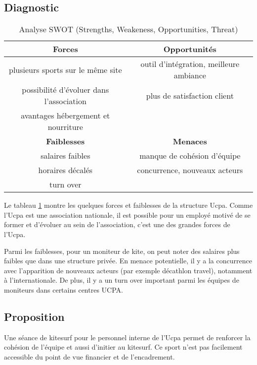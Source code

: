 \documentclass[11pt,a4paper]{report}
\begin{document}
\subsection{Diagnostic}
\begin{table}[h]
\centering
\begin{tabular}{|c|c|}
        \hline
        \textbf{Forces}                          & \textbf{Opportunités} \\ 
        \hline
        plusieurs sports sur le m\^eme site      &  outil d'intégration, meilleure ambiance\\
        possibilité d'évoluer dans l'association & plus de satisfaction client  \\
        avantages hébergement et nourriture      &                              \\
        \hline
        \textbf{Faiblesses}                      &  \textbf{Menaces} \\ 
        \hline
        salaires faibles                         & manque de cohésion d'équipe \\
        horaires décalés                         & concurrence, nouveaux acteurs   \\
        turn over                                &                               \\
        \hline
\end{tabular}
\caption{Analyse SWOT (Strengths, Weakeness, Opportunities, Threat)\label{swot}}
\end{table}
Le tableau \ref{swot} montre les quelques forces et faiblesses de la 
structure Ucpa. Comme l'Ucpa est une association nationale, il est 
possible pour un  employé motivé de se former et d'évoluer
au sein de l'association, c'est une des grandes forces de l'Ucpa.
 
Parmi les faiblesses, pour un moniteur de kite, on peut noter des
salaires plus faibles que dans une structure privée. 
En menace potentielle, il y a  la concurrence avec 
l’apparition de nouveaux acteurs (par exemple décathlon travel),
notamment à l'internationale. De plus, il  y a un turn over
important parmi les équipes  de moniteurs dans certains centres UCPA.

\subsection{Proposition}

Une séance de kitesurf pour le personnel interne de l'Ucpa 
permet de renforcer la cohésion de l'équipe et aussi d'initier au kitesurf.
Ce sport n'est pas facilement  accessible du point de vue financier et
de l'encadrement.
\end{document}

